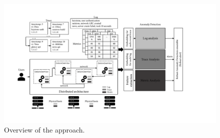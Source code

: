 \begin{figure}[!t]
\centerline{\includegraphics[width=1.0\textwidth]{gfx/chap2/solution_overview.pdf}}
\caption{Overview of the approach.}
\label{fig:solution_overview}
\end{figure}

